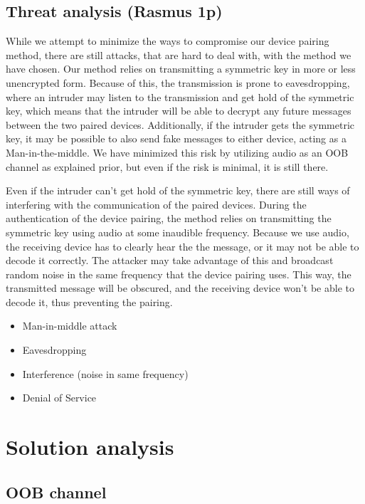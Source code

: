 \documentclass[12pt]{article}
\begin{document}
\subsection{Threat analysis (Rasmus 1p)}
\label{sub:Threat analysis}

While we attempt to minimize the ways to compromise our device pairing method, there are still attacks, that are hard to deal with, with the method we have chosen. Our method relies on transmitting a symmetric key in more or less unencrypted form. Because of this, the transmission is prone to eavesdropping, where an intruder may listen to the transmission and get hold of the symmetric key, which means that the intruder will be able to decrypt any future messages between the two paired devices. Additionally, if the intruder gets the symmetric key, it may be possible to also send fake messages to either device, acting as a Man-in-the-middle. We have minimized this risk by utilizing audio as an OOB channel as explained prior, but even if the risk is minimal, it is still there.

Even if the intruder can't get hold of the symmetric key, there are still ways of interfering with the communication of the paired devices. During the authentication of the device pairing, the method relies on transmitting the symmetric key using audio at some inaudible frequency. Because we use audio, the receiving device has to clearly hear the the message, or it may not be able to decode it correctly. The attacker may take advantage of this and broadcast random noise in the same frequency that the device pairing uses. This way, the transmitted message will be obscured, and the receiving device won't be able to decode it, thus preventing the pairing.

\begin{itemize}
    \item Man-in-middle attack
    \item Eavesdropping
    \item Interference (noise in same frequency)
    \item Denial of Service
\end{itemize}

\newpage
\section{Solution analysis}


\subsection{OOB channel}
\end{document}

